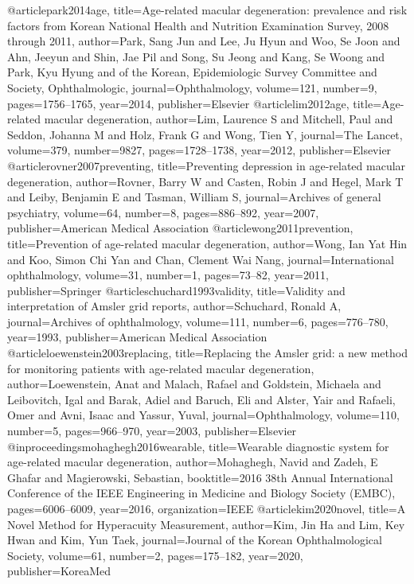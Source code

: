 @article{park2014age,
  title={Age-related macular degeneration: prevalence and risk factors from Korean National Health and Nutrition Examination Survey, 2008 through 2011},
  author={Park, Sang Jun and Lee, Ju Hyun and Woo, Se Joon and Ahn, Jeeyun and Shin, Jae Pil and Song, Su Jeong and Kang, Se Woong and Park, Kyu Hyung and of the Korean, Epidemiologic Survey Committee and Society, Ophthalmologic},
  journal={Ophthalmology},
  volume={121},
  number={9},
  pages={1756--1765},
  year={2014},
  publisher={Elsevier}
}
@article{lim2012age,
  title={Age-related macular degeneration},
  author={Lim, Laurence S and Mitchell, Paul and Seddon, Johanna M and Holz, Frank G and Wong, Tien Y},
  journal={The Lancet},
  volume={379},
  number={9827},
  pages={1728--1738},
  year={2012},
  publisher={Elsevier}
}
@article{rovner2007preventing,
  title={Preventing depression in age-related macular degeneration},
  author={Rovner, Barry W and Casten, Robin J and Hegel, Mark T and Leiby, Benjamin E and Tasman, William S},
  journal={Archives of general psychiatry},
  volume={64},
  number={8},
  pages={886--892},
  year={2007},
  publisher={American Medical Association}
}
@article{wong2011prevention,
  title={Prevention of age-related macular degeneration},
  author={Wong, Ian Yat Hin and Koo, Simon Chi Yan and Chan, Clement Wai Nang},
  journal={International ophthalmology},
  volume={31},
  number={1},
  pages={73--82},
  year={2011},
  publisher={Springer}
}
@article{schuchard1993validity,
  title={Validity and interpretation of Amsler grid reports},
  author={Schuchard, Ronald A},
  journal={Archives of ophthalmology},
  volume={111},
  number={6},
  pages={776--780},
  year={1993},
  publisher={American Medical Association}
}
@article{loewenstein2003replacing,
  title={Replacing the Amsler grid: a new method for monitoring patients with age-related macular degeneration},
  author={Loewenstein, Anat and Malach, Rafael and Goldstein, Michaela and Leibovitch, Igal and Barak, Adiel and Baruch, Eli and Alster, Yair and Rafaeli, Omer and Avni, Isaac and Yassur, Yuval},
  journal={Ophthalmology},
  volume={110},
  number={5},
  pages={966--970},
  year={2003},
  publisher={Elsevier}
}
@inproceedings{mohaghegh2016wearable,
  title={Wearable diagnostic system for age-related macular degeneration},
  author={Mohaghegh, Navid and Zadeh, E Ghafar and Magierowski, Sebastian},
  booktitle={2016 38th Annual International Conference of the IEEE Engineering in Medicine and Biology Society (EMBC)},
  pages={6006--6009},
  year={2016},
  organization={IEEE}
}
@article{kim2020novel,
  title={A Novel Method for Hyperacuity Measurement},
  author={Kim, Jin Ha and Lim, Key Hwan and Kim, Yun Taek},
  journal={Journal of the Korean Ophthalmological Society},
  volume={61},
  number={2},
  pages={175--182},
  year={2020},
  publisher={KoreaMed}
}
